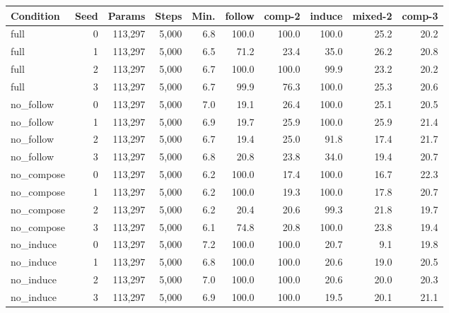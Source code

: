 \begin{tabular}{@{}lrrrrrrrrr@{}}
\toprule
Condition & Seed & Params & Steps & Min. & follow & comp-2 & induce & mixed-2 & comp-3 \\
\midrule
full & 0 & 113{,}297 & 5{,}000 & 6.8 & 100.0 & 100.0 & 100.0 & 25.2 & 20.2 \\
full & 1 & 113{,}297 & 5{,}000 & 6.5 & 71.2 & 23.4 & 35.0 & 26.2 & 20.8 \\
full & 2 & 113{,}297 & 5{,}000 & 6.7 & 100.0 & 100.0 & 99.9 & 23.2 & 20.2 \\
full & 3 & 113{,}297 & 5{,}000 & 6.7 & 99.9 & 76.3 & 100.0 & 25.3 & 20.6 \\
no\_follow & 0 & 113{,}297 & 5{,}000 & 7.0 & 19.1 & 26.4 & 100.0 & 25.1 & 20.5 \\
no\_follow & 1 & 113{,}297 & 5{,}000 & 6.9 & 19.7 & 25.9 & 100.0 & 25.9 & 21.4 \\
no\_follow & 2 & 113{,}297 & 5{,}000 & 6.7 & 19.4 & 25.0 & 91.8 & 17.4 & 21.7 \\
no\_follow & 3 & 113{,}297 & 5{,}000 & 6.8 & 20.8 & 23.8 & 34.0 & 19.4 & 20.7 \\
no\_compose & 0 & 113{,}297 & 5{,}000 & 6.2 & 100.0 & 17.4 & 100.0 & 16.7 & 22.3 \\
no\_compose & 1 & 113{,}297 & 5{,}000 & 6.2 & 100.0 & 19.3 & 100.0 & 17.8 & 20.7 \\
no\_compose & 2 & 113{,}297 & 5{,}000 & 6.2 & 20.4 & 20.6 & 99.3 & 21.8 & 19.7 \\
no\_compose & 3 & 113{,}297 & 5{,}000 & 6.1 & 74.8 & 20.8 & 100.0 & 23.8 & 19.4 \\
no\_induce & 0 & 113{,}297 & 5{,}000 & 7.2 & 100.0 & 100.0 & 20.7 & 9.1 & 19.8 \\
no\_induce & 1 & 113{,}297 & 5{,}000 & 6.8 & 100.0 & 100.0 & 20.6 & 19.0 & 20.5 \\
no\_induce & 2 & 113{,}297 & 5{,}000 & 7.0 & 100.0 & 100.0 & 20.6 & 20.0 & 20.3 \\
no\_induce & 3 & 113{,}297 & 5{,}000 & 6.9 & 100.0 & 100.0 & 19.5 & 20.1 & 21.1 \\
\bottomrule
\end{tabular}
